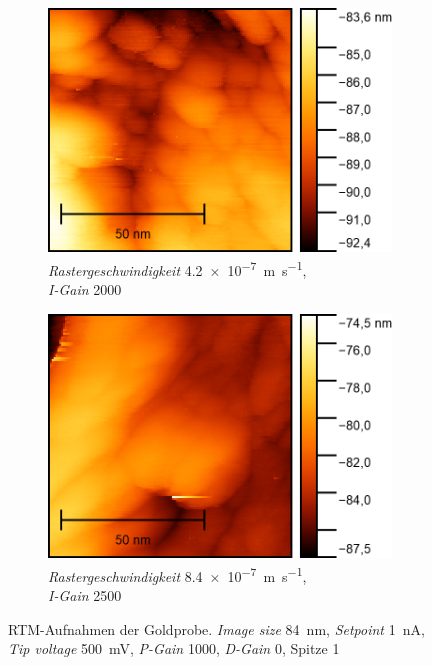 \begin{figure}[H]
    \centering
    \begin{subfigure}{0.45\textwidth}
        \centering
        \includegraphics[width=\linewidth]{../figs/Gold10453}
        \caption{\textit{Rastergeschwindigkeit} \SI{4,2e-7}{\meter \per \second},\\ \textit{I-Gain} \num{2000}}
    \end{subfigure}
    \begin{subfigure}{0.45\textwidth}
        \centering
        \includegraphics[width=\linewidth]{../figs/Gold10460}
        \caption{\textit{Rastergeschwindigkeit} \SI{8,4e-7}{\meter \per \second},\\ \textit{I-Gain} \num{2500}}
    \end{subfigure}
    \caption{RTM-Aufnahmen der Goldprobe. \textit{Image size} \SI{84}{\nano \meter}, \textit{Setpoint} \SI{1}{\nano \ampere},
    \textit{Tip voltage} \SI{500}{\milli \volt}, \textit{P-Gain} \num{1000}, \textit{D-Gain} \num{0}, Spitze 1}\label{fig:gold2}
\end{figure}
